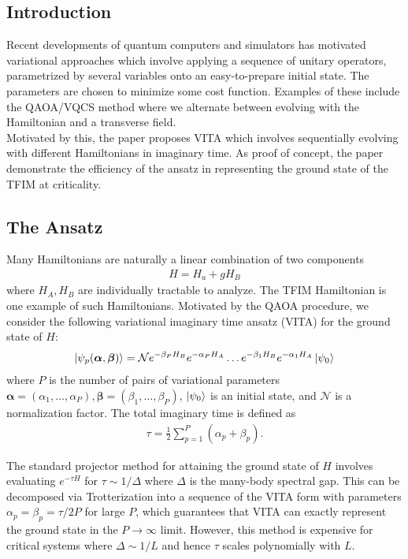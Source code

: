 \documentclass{book}
\theoremstyle{definition}
\newcommand{\al}{\alpha}
\newcommand{\be}{\beta}
\newcommand{\f}[2]{\frac{#1}{#2}}
\begin{document}
\subsection{Introduction}

Recent developments of quantum computers and simulators has motivated variational approaches which involve applying a sequence of unitary operators, parametrized by several variables onto an easy-to-prepare initial state. The parameters are chosen to minimize some cost function. Examples of these include the QAOA/VQCS method where we alternate between evolving with the Hamiltonian and a transverse field. \\


Motivated by this, the paper proposes VITA which involves sequentially evolving with different Hamiltonians in imaginary time. As proof of concept, the paper demonstrate the efficiency of the ansatz in representing the ground state of the TFIM at criticality. 


\subsection{The Ansatz}

Many Hamiltonians are naturally a linear combination of two components
\begin{align}
H = H_a + g H_B
\end{align}
where $H_A, H_B$ are individually tractable to analyze. The TFIM Hamiltonian is one example of such Hamiltonians. Motivated by the QAOA procedure, we consider the following variational imaginary time ansatz (VITA) for the ground state of $H$:
\begin{align}
\ket{\psi_p(\bm \al, \bm \beta)} = \mathcal{N} e^{-\be_P H_B}e^{-\al_P H_A}\dots e^{-\be_1H_B}e^{-\al_1 H_A} \ket{\psi_0}
\end{align}
where $P$ is the number of pairs of variational parameters $\bm \al = (\al_1, \dots, \al_P), \bm \beta = (\be_1,\dots, \be_P)$, $\ket{\psi_0}$ is an initial state, and $\mathcal{N}$ is a normalization factor. The total imaginary time is defined as
\begin{align}
\tau = \f{1}{2}\sum_{p=1}^P (\al_p + \be_p).
\end{align}

The standard projector method for attaining the ground state of $H$ involves evaluating $e^{-\tau H}$ for $\tau \sim 1/\Delta $ where $\Delta$ is the many-body spectral gap. This can be decomposed via Trotterization into a sequence of the VITA form with parameters $\al_p = \be_p = \tau/2P$ for large $P$, which guarantees that VITA can exactly represent the ground state in the $P\to \infty$ limit. However, this method is expensive for critical systems where $\Delta \sim 1/L$ and hence $\tau$ scales polynomially with $L$. \\
\end{document}
